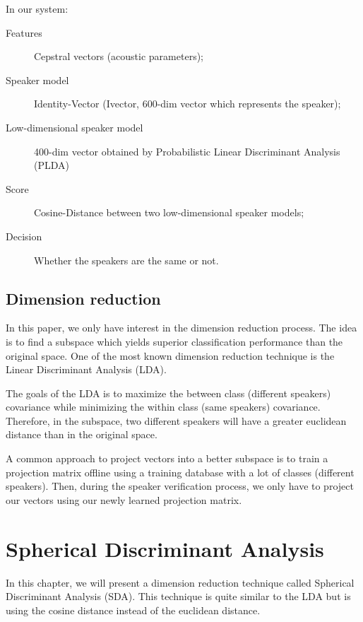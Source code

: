 \documentclass{techrep} %
\begin{document}
In our system:
\begin{description}
\item[Features] Cepstral vectors (acoustic parameters);
\item[Speaker model] Identity-Vector (Ivector, 600-dim vector which
  represents the speaker);
\item[Low-dimensional speaker model] 400-dim vector obtained by
  Probabilistic Linear Discriminant Analysis (PLDA)
\item[Score] Cosine-Distance between two low-dimensional speaker models;
\item[Decision] Whether the speakers are the same or not.
\end{description}

\section{Dimension reduction}

In this paper, we only have interest in the dimension reduction
process. The idea is to find a subspace which yields superior
classification performance than the original space. One of the most
known dimension reduction technique is the Linear Discriminant
Analysis (LDA).

The goals of the LDA is to maximize the between class (different
speakers) covariance while minimizing the within class (same speakers)
covariance. Therefore, in the subspace, two different speakers will
have a greater euclidean distance than in the original space.

A common approach to project vectors into a better subspace is to
train a projection matrix offline using a training database with a lot
of classes (different speakers). Then, during the speaker verification process, we only
have to project our vectors using our newly learned projection matrix.

\chapter{Spherical Discriminant Analysis}



In this chapter, we will present a dimension reduction technique
called Spherical Discriminant Analysis (SDA). This technique is quite
similar to the LDA but is using the cosine distance instead of the
euclidean distance.

\newcommand{\argmax}[1]{\smash{\mathop{{\rm argmax}}\limits_{W}}\, #1}
\newcommand{\argmin}[1]{\smash{\mathop{{\rm argmin}}\limits_{W}}\, #1}
\end{document}
